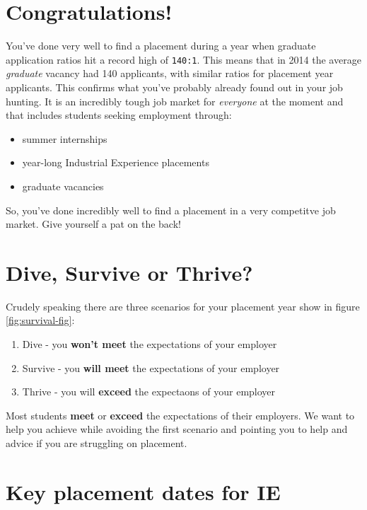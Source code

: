 \documentclass[
]{book}
\providecommand{\tightlist}{%
  \setlength{\itemsep}{0pt}\setlength{\parskip}{0pt}}
\begin{document}
\section{Congratulations!}\label{congrats}

You've done very well to find a placement during a year when graduate application ratios hit a record high of \texttt{140:1}. This means that in 2014 the average \emph{graduate} vacancy had 140 applicants, with similar ratios for placement year applicants. \citep{ratio} This confirms what you've probably already found out in your job hunting. It is an incredibly tough job market for \emph{everyone} at the moment and that includes students seeking employment through:

\begin{itemize}
\tightlist
\item
  summer internships
\item
  year-long Industrial Experience placements
\item
  graduate vacancies
\end{itemize}

So, you've done incredibly well to find a placement in a very competitve job market. Give yourself a pat on the back!

\section{Dive, Survive or Thrive?}\label{thrive}

Crudely speaking there are three scenarios for your placement year show in figure \ref{fig:survival-fig}:

\begin{enumerate}
\def\labelenumi{\arabic{enumi}.}
\tightlist
\item
  Dive - you \textbf{won't meet} the expectations of your employer
\item
  Survive - you \textbf{will meet} the expectations of your employer
\item
  Thrive - you will \textbf{exceed} the expectaons of your employer
\end{enumerate}

Most students \textbf{meet} or \textbf{exceed} the expectations of their employers. We want to help you achieve while avoiding the first scenario and pointing you to help and advice if you are struggling on placement.

\section{Key placement dates for IE}\label{keydates}
\end{document}

